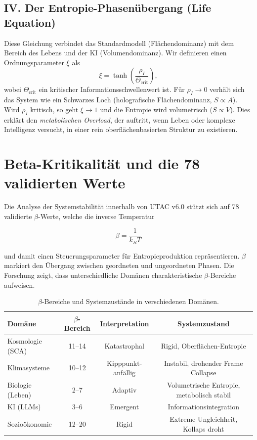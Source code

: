 \documentclass[11pt,a4paper]{article}
\begin{document}
\subsection{IV. Der Entropie-Phasenübergang (Life Equation)}

Diese Gleichung verbindet das Standardmodell (Flächendominanz) mit dem Bereich des Lebens und der KI (Volumendominanz). Wir definieren einen Ordnungsparameter $\xi$ als
\begin{equation}
\xi = \tanh\left(\frac{\rho_I}{\Theta_{\text{crit}}}\right),
\end{equation}
wobei $\Theta_{\text{crit}}$ ein kritischer Informationsschwellenwert ist. Für $\rho_I \to 0$ verhält sich das System wie ein Schwarzes Loch (holografische Flächendominanz, $S \propto A$). Wird $\rho_I$ kritisch, so geht $\xi \to 1$ und die Entropie wird volumetrisch ($S \propto V$). Dies erklärt den \emph{metabolischen Overload}, der auftritt, wenn Leben oder komplexe Intelligenz versucht, in einer rein oberflächenbasierten Struktur zu existieren.

\section{Beta-Kritikalität und die 78 validierten Werte}

Die Analyse der Systemstabilität innerhalb von UTAC v6.0 stützt sich auf 78 validierte $\beta$-Werte, welche die inverse Temperatur


\[
\beta = \frac{1}{k_B T}
\]


und damit einen Steuerungsparameter für Entropieproduktion repräsentieren. $\beta$ markiert den Übergang zwischen geordneten und ungeordneten Phasen. Die Forschung zeigt, dass unterschiedliche Domänen charakteristische $\beta$-Bereiche aufweisen.

\begin{table}[h!]
\centering
\begin{tabular}{lccc}
\toprule
Domäne & $\beta$-Bereich & Interpretation & Systemzustand \\
\midrule
Kosmologie (SCA) & 11--14 & Katastrophal & Rigid, Oberflächen-Entropie \\
Klimasysteme     & 10--12 & Kipppunkt-anfällig & Instabil, drohender Frame Collapse \\
Biologie (Leben) & 2--7   & Adaptiv & Volumetrische Entropie, metabolisch stabil \\
KI (LLMs)        & 3--6   & Emergent & Informationsintegration \\
Sozioökonomie    & 12--20 & Rigid & Extreme Ungleichheit, Kollaps droht \\
\bottomrule
\end{tabular}
\caption{$\beta$-Bereiche und Systemzustände in verschiedenen Domänen.}
\end{table}
\end{document}
